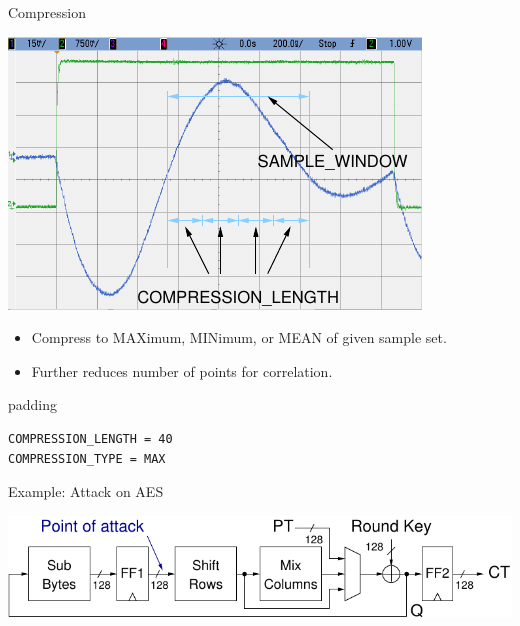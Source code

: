 \documentclass[final]{beamer}
\begin{document}
\begin{frame}[fragile]{}
\begin{columns}[t]
\begin{column}{.31\linewidth}
\begin{block}{Compression}
        \begin{minipage}[t]{0.49\linewidth}
		\includegraphics[width=0.9\linewidth]{../figures/oscilloscope-compression-window}
        \end{minipage}%
        \begin{minipage}[t]{0.49\linewidth}%
          \vspace{-6.5cm}%
         \begin{itemize}
           \item Compress to MAXimum, MINimum, or MEAN of given sample set.
           \item Further reduces number of points for correlation.
         \end{itemize} 
          \begin{center}
            \begin{beamercolorbox}[rounded=true]{padding}%
               \footnotesize%
              \begin{lstlisting}
COMPRESSION_LENGTH = 40
COMPRESSION_TYPE = MAX
              \end{lstlisting}
            \end{beamercolorbox}
          \end{center}
        \end{minipage}
       \end{block}
       \begin{block}{Example: Attack on AES}
         \begin{center}
           \includegraphics[width=0.9\linewidth]{../figures/aes128}

\end{center}
\end{block}
\end{column}
\end{columns}
\end{frame}
\end{document}
